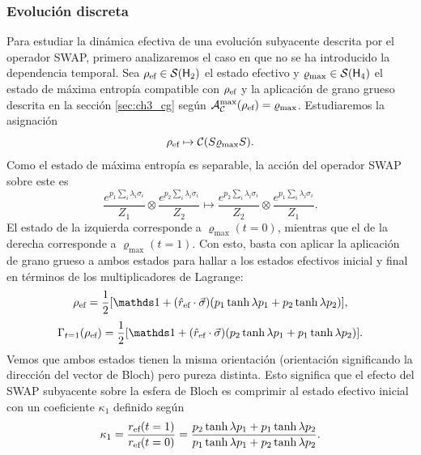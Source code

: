 \subsubsection{Evolución discreta}

Para estudiar la dinámica efectiva de una evolución subyacente descrita por el operador SWAP, primero analizaremos el caso en que no se ha introducido la dependencia temporal. Sea $\rho_{\text{ef}}\in\mathcal{S}({\sf H}_{2})$ el estado efectivo y $\varrho_{\max}\in\mathcal{S}({\sf H}_{4})$ el estado de máxima entropía compatible con $\rho_{\text{ef}}$ y la aplicación de grano grueso descrita en la sección \ref{sec:ch3_cg} según $\mathcal{A}_{\mathcal{C}}^{\max}(\rho_{\text{ef}})=\varrho_{\max}$. Estudiaremos la asignación
\begin{equation}
  \rho_{\text{ef}}\mapsto \mathcal{C}(S \varrho_{\max} S).
\end{equation}
Como el estado de máxima entropía es separable, la acción del operador SWAP sobre este es
\begin{equation}
  \frac{e^{p_{1}\sum_{i}\lambda_{i}\sigma_{i}}}{Z_{1}} \otimes \frac{e^{p_{2}\sum_{i}\lambda_{i}\sigma_{i}}}{Z_{2}}\mapsto\frac{e^{p_{2}\sum_{i}\lambda_{i}\sigma_{i}}}{Z_{2}}\otimes\frac{e^{p_{1}\sum_{i}\lambda_{i}\sigma_{i}}}{Z_{1}}.\nonumber
\end{equation}
El estado de la izquierda corresponde a $\varrho_{\max}(t=0)$, mientras que el de la derecha corresponde a $\varrho_{\max}(t=1)$. Con esto, basta con aplicar la aplicación de grano grueso a ambos estados para hallar a los estados efectivos inicial y final en términos de los multiplicadores de Lagrange:
\begin{equation}
\rho_{\ef}=\frac{1}{2}[\Id+(\hat{r}_{\ef}\cdot\vec{\sigma})(p_{1}\tanh{\lambda p_{1}}+p_{2}\tanh{\lambda p_{2}})],
\end{equation}
\begin{equation}
\Gamma_{t=1}(\rho_{\ef})=\frac{1}{2}[\Id+(\hat{r}_{\ef}\cdot\vec{\sigma})(p_{2}\tanh{\lambda p_{1}}+p_{1}\tanh{\lambda p_{2}})].
\end{equation}
Vemos que ambos estados tienen la misma orientación (orientación significando la dirección del vector de Bloch) pero pureza distinta. Esto significa que el efecto del \textsc{SWAP} subyacente sobre la esfera de Bloch es comprimir al estado efectivo inicial con un coeficiente $\kappa_{1}$ definido según
\begin{equation}\label{eq:SWAPFactor}
  \kappa_{1}=\frac{r_{\text{ef}}(t=1)}{r_{\text{ef}}(t=0)}=\frac{p_{2}\tanh{\lambda p_{1}}+p_{1}\tanh{\lambda p_{2}}}{
    p_{1}\tanh{\lambda p_{1}}+p_{2}\tanh{\lambda p_{2}}}.
\end{equation}
